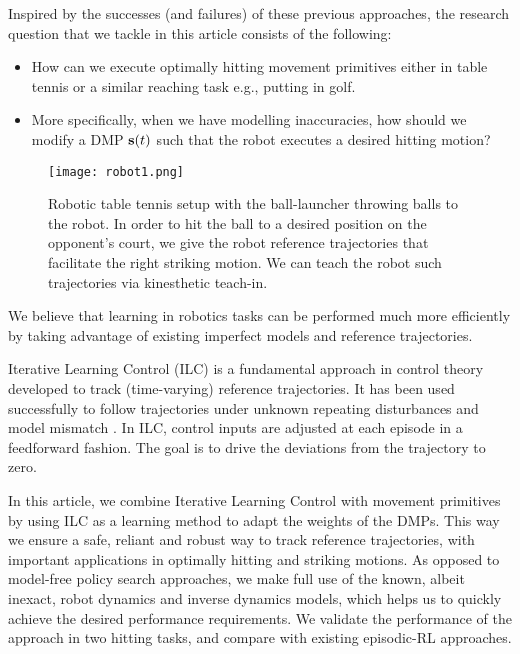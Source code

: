 Inspired by the successes (and failures) of these previous approaches, the research question that we tackle in this article consists of the following:
%
\begin{itemize}
\item How can we execute optimally hitting movement primitives either in table tennis or a similar reaching task e.g., putting in golf.
%
\item More specifically, when we have modelling inaccuracies, how should we modify a DMP $\boldsymbol{\mathrm{s}}(t)$ such that the robot executes a desired hitting motion?
\end{itemize}
%
\begin{figure}[b!]
\center
\texttt{[image: robot1.png]}			
\caption{Robotic table tennis setup with the ball-launcher throwing balls to the robot. In order to hit the ball to a desired position on the opponent's court, we give the robot reference trajectories that facilitate the right striking motion. We can teach the robot such trajectories via kinesthetic teach-in.}
\label{robot}
\end{figure}
%
\noindent We believe that learning in robotics tasks can be performed much more efficiently by taking advantage of existing imperfect models and reference trajectories. %

Iterative Learning Control (ILC) is a fundamental approach in control theory developed to track (time-varying) reference trajectories. It has been used successfully to follow trajectories under unknown repeating disturbances and model mismatch \cite{Bristow06}. In ILC, control inputs are adjusted at each episode in a feedforward fashion. The goal is to drive the deviations from the trajectory to zero. 

In this article, we combine Iterative Learning Control with movement primitives by using ILC as a learning method to adapt the weights of the DMPs. This way we ensure a safe, reliant and robust way to track reference trajectories, with important applications in optimally hitting and striking motions. As opposed to model-free policy search approaches, we make full use of the known, albeit inexact, robot dynamics and inverse dynamics models, which helps us to quickly achieve the desired performance requirements. We validate the performance of the approach in two hitting tasks, and compare with existing episodic-RL approaches.

